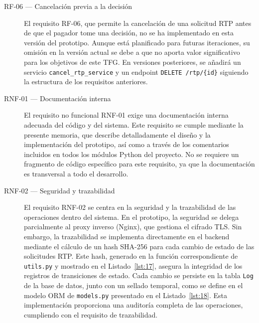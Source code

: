 \begin{description}
\item[RF-06 — Cancelación previa a la decisión]  
El requisito RF-06, que permite la cancelación de una solicitud RTP antes de que el pagador tome una decisión, no se ha implementado en esta versión del prototipo. Aunque está planificado para futuras iteraciones, su omisión en la versión actual se debe a que no aporta valor significativo para los objetivos de este TFG. En versiones posteriores, se añadirá un servicio \texttt{cancel\_rtp\_service} y un endpoint \texttt{DELETE /rtp/\{id\}} siguiendo la estructura de los requisitos anteriores.

\item[RNF-01 — Documentación interna]  
El requisito no funcional RNF-01 exige una documentación interna adecuada del código y del sistema. Este requisito se cumple mediante la presente memoria, que describe detalladamente el diseño y la implementación del prototipo, así como a través de los comentarios incluidos en todos los módulos Python del proyecto. No se requiere un fragmento de código específico para este requisito, ya que la documentación es transversal a todo el desarrollo.

\item[RNF-02 — Seguridad y trazabilidad]  
El requisito RNF-02 se centra en la seguridad y la trazabilidad de las operaciones dentro del sistema. En el prototipo, la seguridad se delega parcialmente al proxy inverso (Nginx), que gestiona el cifrado TLS. Sin embargo, la trazabilidad se implementa directamente en el backend mediante el cálculo de un hash SHA-256 para cada cambio de estado de las solicitudes RTP. Este hash, generado en la función correspondiente de \texttt{utils.py} y mostrado en el Listado~\ref{lst:17}, asegura la integridad de los registros de transiciones de estado. Cada cambio se persiste en la tabla \texttt{Log} de la base de datos, junto con un sellado temporal, como se define en el modelo ORM de \texttt{models.py} presentado en el Listado~\ref{lst:18}. Esta implementación proporciona una auditoría completa de las operaciones, cumpliendo con el requisito de trazabilidad.


\end{description}
